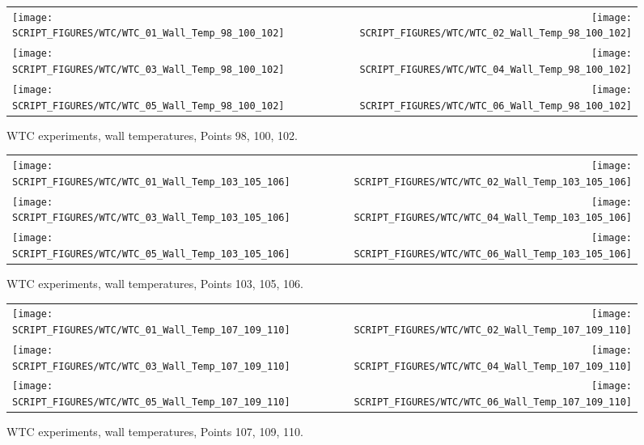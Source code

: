 \begin{figure}[p]
\begin{tabular*}{\textwidth}{l@{\extracolsep{\fill}}r}
\texttt{[image: SCRIPT\_FIGURES/WTC/WTC\_01\_Wall\_Temp\_98\_100\_102]} &
\texttt{[image: SCRIPT\_FIGURES/WTC/WTC\_02\_Wall\_Temp\_98\_100\_102]} \\
\texttt{[image: SCRIPT\_FIGURES/WTC/WTC\_03\_Wall\_Temp\_98\_100\_102]} &
\texttt{[image: SCRIPT\_FIGURES/WTC/WTC\_04\_Wall\_Temp\_98\_100\_102]} \\
\texttt{[image: SCRIPT\_FIGURES/WTC/WTC\_05\_Wall\_Temp\_98\_100\_102]} &
\texttt{[image: SCRIPT\_FIGURES/WTC/WTC\_06\_Wall\_Temp\_98\_100\_102]}
\end{tabular*}
\caption{WTC experiments, wall temperatures, Points 98, 100, 102.}
\label{NIST_WTC_Wall_98_100_102}
\end{figure}

\begin{figure}[p]
\begin{tabular*}{\textwidth}{l@{\extracolsep{\fill}}r}
\texttt{[image: SCRIPT\_FIGURES/WTC/WTC\_01\_Wall\_Temp\_103\_105\_106]} &
\texttt{[image: SCRIPT\_FIGURES/WTC/WTC\_02\_Wall\_Temp\_103\_105\_106]} \\
\texttt{[image: SCRIPT\_FIGURES/WTC/WTC\_03\_Wall\_Temp\_103\_105\_106]} &
\texttt{[image: SCRIPT\_FIGURES/WTC/WTC\_04\_Wall\_Temp\_103\_105\_106]} \\
\texttt{[image: SCRIPT\_FIGURES/WTC/WTC\_05\_Wall\_Temp\_103\_105\_106]} &
\texttt{[image: SCRIPT\_FIGURES/WTC/WTC\_06\_Wall\_Temp\_103\_105\_106]}
\end{tabular*}
\caption{WTC experiments, wall temperatures, Points 103, 105, 106.}
\label{NIST_WTC_Wall_103_105_106}
\end{figure}

\begin{figure}[p]
\begin{tabular*}{\textwidth}{l@{\extracolsep{\fill}}r}
\texttt{[image: SCRIPT\_FIGURES/WTC/WTC\_01\_Wall\_Temp\_107\_109\_110]} &
\texttt{[image: SCRIPT\_FIGURES/WTC/WTC\_02\_Wall\_Temp\_107\_109\_110]} \\
\texttt{[image: SCRIPT\_FIGURES/WTC/WTC\_03\_Wall\_Temp\_107\_109\_110]} &
\texttt{[image: SCRIPT\_FIGURES/WTC/WTC\_04\_Wall\_Temp\_107\_109\_110]} \\
\texttt{[image: SCRIPT\_FIGURES/WTC/WTC\_05\_Wall\_Temp\_107\_109\_110]} &
\texttt{[image: SCRIPT\_FIGURES/WTC/WTC\_06\_Wall\_Temp\_107\_109\_110]}
\end{tabular*}
\caption{WTC experiments, wall temperatures, Points 107, 109, 110.}
\label{NIST_WTC_Wall_107_109_110}
\end{figure}

